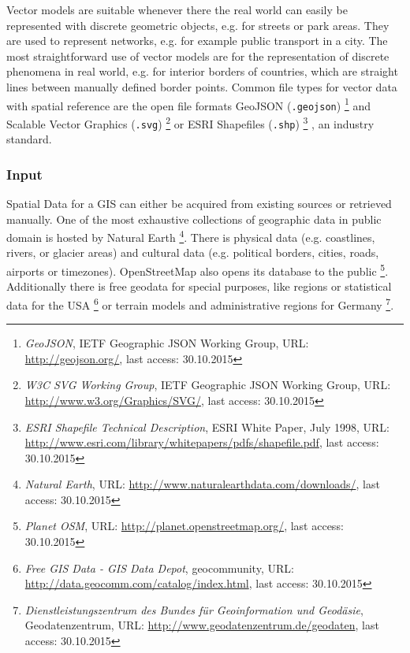 Vector models are suitable whenever there the real world can easily be represented with discrete geometric objects, e.g. for streets or park areas. They are used to represent networks, e.g. for example public transport in a city. The most straightforward use of vector models are for the representation of discrete phenomena in real world, e.g. for interior borders of countries, which are straight lines between manually defined border points. Common file types for vector data with spatial reference are the open file formats GeoJSON (\texttt{.geojson})
\footnote{
  \textit{GeoJSON},
  IETF Geographic JSON Working Group,
  URL: \url{http://geojson.org/},
  last access: 30.10.2015
}
and Scalable Vector Graphics (\texttt{.svg})
\footnote{
  \textit{W3C SVG Working Group},
  IETF Geographic JSON Working Group,
  URL: \url{http://www.w3.org/Graphics/SVG/},
  last access: 30.10.2015
}
or ESRI Shapefiles (\texttt{.shp})
\footnote{
  \textit{ESRI Shapefile Technical Description},
  ESRI White Paper, July 1998,
  URL: \url{http://www.esri.com/library/whitepapers/pdfs/shapefile.pdf},
  last access: 30.10.2015
}
, an industry standard.




\subsubsection{Input} %
\label{ssub:input}

Spatial Data for a GIS can either be acquired from existing sources or retrieved manually. One of the most exhaustive collections of geographic data in public domain is hosted by Natural Earth
\footnote{
  \textit{Natural Earth},
  URL: \url{http://www.naturalearthdata.com/downloads/},
  last access: 30.10.2015
}.
There is physical data (e.g. coastlines, rivers, or glacier areas) and cultural data (e.g. political borders, cities, roads, airports or timezones). OpenStreetMap also opens its database to the public
\footnote{
  \textit{Planet OSM},
  URL: \url{http://planet.openstreetmap.org/},
  last access: 30.10.2015
}.
Additionally there is free geodata for special purposes, like regions or statistical data for the USA
\footnote{
  \textit{Free GIS Data - GIS Data Depot},
  geocommunity,
  URL: \url{http://data.geocomm.com/catalog/index.html},
  last access: 30.10.2015
}
or terrain models and administrative regions for Germany
\footnote{
  \textit{Dienstleistungszentrum des Bundes für Geoinformation und Geodäsie},
  Geodatenzentrum,
  URL: \url{http://www.geodatenzentrum.de/geodaten},
  last access: 30.10.2015
}.

